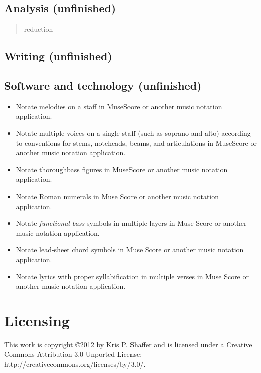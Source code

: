 \section{Analysis (unfinished)}
\label{analysisunfinished}

\begin{quote}

reduction
\end{quote}

\section{Writing (unfinished)}
\label{writingunfinished}

\section{Software and technology (unfinished)}
\label{softwareandtechnologyunfinished}

\begin{itemize}
\item Notate melodies on a staff in MuseScore or another music notation application.

\item Notate multiple voices on a single staff (such as soprano and alto) according to conventions for stems, noteheads, beams, and articulations in MuseScore or another music notation application.

\item Notate thoroughbass figures in MuseScore or another music notation application.

\item Notate Roman numerals in Muse Score or another music notation application.

\item Notate \emph{functional bass} symbols in multiple layers in Muse Score or another music notation application.

\item Notate lead-sheet chord symbols in Muse Score or another music notation application.

\item Notate lyrics with proper syllabification in multiple verses in Muse Score or another music notation application.

\end{itemize}

\chapter{Licensing}
\label{licensing}

This work is copyright ©2012 by Kris P. Shaffer and is licensed under a Creative Commons Attribution 3.0 Unported License: http:/\slash creativecommons.org\slash licenses\slash by\slash 3.0\slash .




